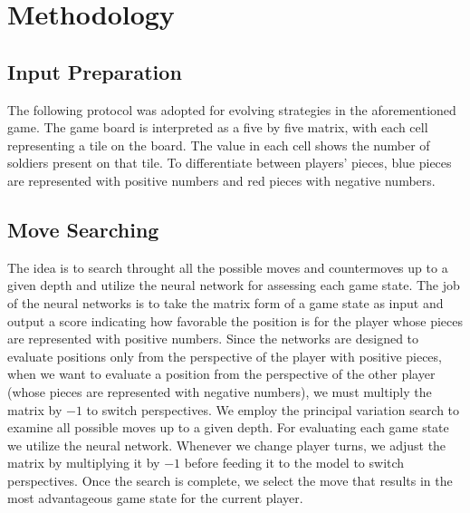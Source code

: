 \documentclass[letterpaper, 12pt]{article}
\begin{document}
\section*{Methodology}

\subsection*{Input Preparation}

The following protocol was adopted for evolving strategies in the aforementioned game.
The game board is interpreted as a five by five matrix, with each cell representing a
tile on the board. The value in each cell shows the number of soldiers present on that
tile. To differentiate between players' pieces, blue pieces are represented with
positive numbers and red pieces with negative numbers.

\subsection*{Move Searching} 

The idea is to search throught all the possible moves and countermoves up to a given
depth and utilize the neural network for assessing each game state. The job of the
neural networks is to take the matrix form of a game state as input and output a score
indicating how favorable the position is for the player whose pieces are represented
with positive numbers. Since the networks are designed to evaluate positions only from
the perspective of the player with positive pieces, when we want to evaluate a position
from the perspective of the other player (whose pieces are represented with negative
numbers), we must multiply the matrix by \(-1\) to switch perspectives. We employ the
principal variation search to examine all possible moves up to a given depth. For
evaluating each game state we utilize the neural network. Whenever we change player
turns, we adjust the matrix by multiplying it by \(-1\) before feeding it to the model
to switch perspectives. Once the search is complete, we select the move that results in
the most advantageous game state for the current player.



\end{document}
